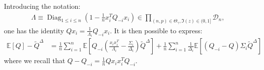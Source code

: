 \documentclass[ECP, preprint]{ejpecp} %
\DeclareMathOperator{\diag}{Diag}
\begin{document}
Introducing the notation:
\begin{align*}
   \Lambda \equiv \diag_{1\leq i \leq n} \left( 1 - \frac1nx_i^TQ_{-i}x_i \right) \in \prod_{(n,p)\in \Theta_\gamma, \Im(z)\in (0,1]} \mathcal D_n,
 \end{align*} 
 one has the identity $Q x_i = \frac{1}{\Lambda_i}Q_{-i} x_i$.
It is then possible to express:
\begin{align}\label{eq:definition_epsilon_1_2}
\mathbb{E} \left[Q\right] - \tilde Q^\Delta 
    &= \frac{1}{n}\sum_{i=1}^n  \mathbb{E}\left[Q_{-i} \left(\frac{x_ix_i^T}{\Lambda_i} - \frac{\Sigma_i}{\Delta_i}\right)\tilde{Q}^\Delta\right] 
    + \frac{1}{n}\sum_{i=1}^n \frac{1}{\Delta_i}\mathbb{E}\left[(Q_{-i} - Q) \Sigma_i \tilde Q^\Delta\right]
\end{align}
where we recall that $Q - Q_{-i} = \frac{1}{n}Qx_i x_i^TQ_{-i}$.
\end{document}
